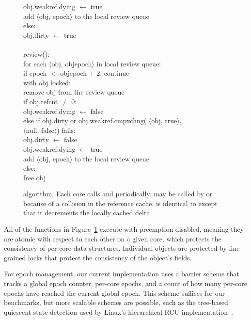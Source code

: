 \begin{figure}
\begin{tabbing}
            obj.weakref.dying $\gets$ true \\
            add $\langle$obj, epoch$\rangle$ to the local review
            queue \-\\
          else: \+\\
            obj.dirty $\gets$ true \\
    \-\-\-\-\\
    review(): \+\\
      for each $\langle$obj, objepoch$\rangle$ in local review queue: \+\\
        if epoch $<$ objepoch + 2: continue \\
        with obj locked: \+\\
          remove obj from the review queue \\
          if obj.refcnt $\ne$ 0: \+\\
            obj.weakref.dying $\gets$ false \-\\
          else if obj.dirty or obj.weakref.cmpxchng(%
                $\langle$obj, true$\rangle$, \+\+\\
                $\langle$null, false$\rangle$) fails: \-\\
            obj.dirty $\gets$ false \\
            obj.weakref.dying $\gets$ true \\
            add $\langle$obj, epoch$\rangle$ to the local review queue \-\\
          else: \+\\
            free obj
  \end{tabbing}
  \vspace{-1em}                 %
  \caption[ algorithm.]
  { algorithm.  Each core calls  and 
    periodically.   may be called by  or because of a
    collision in the reference cache.   is identical to  except
    that it decrements the locally cached delta.}
  \label{fig:refcache-code}
\end{figure}

All of the functions in Figure~\ref{fig:refcache-code} execute with
preemption disabled, meaning they are atomic with respect to each
other on a given core, which protects the consistency of per-core data
structures.  Individual objects are protected by fine-grained locks
that protect the consistency of the object's fields.

For epoch management, our current implementation uses a barrier scheme
that tracks a global epoch counter, per-core epochs, and a count of
how many per-core epochs have reached the current global epoch.  This
scheme suffices for our benchmarks, but more scalable schemes are
possible, such as the tree-based quiescent state detection used
by Linux's hierarchical RCU implementation~\cite{lwn:treercu}.

